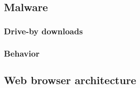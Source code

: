 \subsection{Malware}
\subsubsection{Drive-by downloads}
\subsubsection{Behavior}


\subsection{Web browser architecture}



